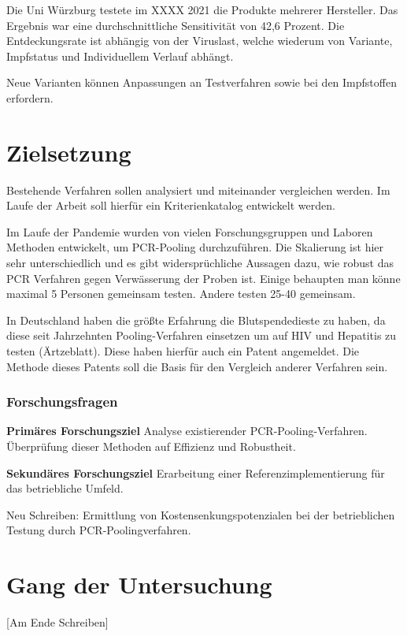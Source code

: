 Die Uni Würzburg testete im XXXX 2021 die Produkte mehrerer Hersteller.
Das Ergebnis war eine durchschnittliche Sensitivität von 42,6 Prozent.
Die Entdeckungsrate ist abhängig von der Viruslast, welche wiederum von Variante, Impfstatus und Individuellem Verlauf abhängt.

Neue Varianten können Anpassungen an Testverfahren sowie bei den Impfstoffen erfordern.

\section{Zielsetzung}
Bestehende Verfahren sollen analysiert und miteinander vergleichen werden.
Im Laufe der Arbeit soll hierfür ein Kriterienkatalog entwickelt werden.

Im Laufe der Pandemie wurden von vielen Forschungsgruppen und Laboren Methoden entwickelt, um PCR-Pooling durchzuführen. Die Skalierung ist hier sehr unterschiedlich und es gibt widersprüchliche Aussagen dazu, wie robust das PCR Verfahren gegen Verwässerung der Proben ist. Einige behaupten man könne maximal 5 Personen gemeinsam testen. Andere testen 25-40 gemeinsam.

In Deutschland haben die größte Erfahrung die Blutspendedieste zu haben, da diese seit Jahrzehnten Pooling-Verfahren einsetzen um auf HIV und Hepatitis zu testen (Ärtzeblatt). Diese haben hierfür auch ein Patent angemeldet. Die Methode dieses Patents soll die Basis für den Vergleich anderer Verfahren sein.

\subsubsection{Forschungsfragen}
\textbf{Primäres Forschungsziel}\newline
Analyse existierender PCR-Pooling-Verfahren.\newline
Überprüfung dieser Methoden auf Effizienz und Robustheit.

\textbf{Sekundäres Forschungsziel}\newline 
Erarbeitung einer Referenzimplementierung für das betriebliche Umfeld.\newline

Neu Schreiben:
Ermittlung von Kostensenkungspotenzialen bei der betrieblichen Testung durch PCR-Poolingverfahren.

\section{Gang der Untersuchung}
[Am Ende Schreiben]

